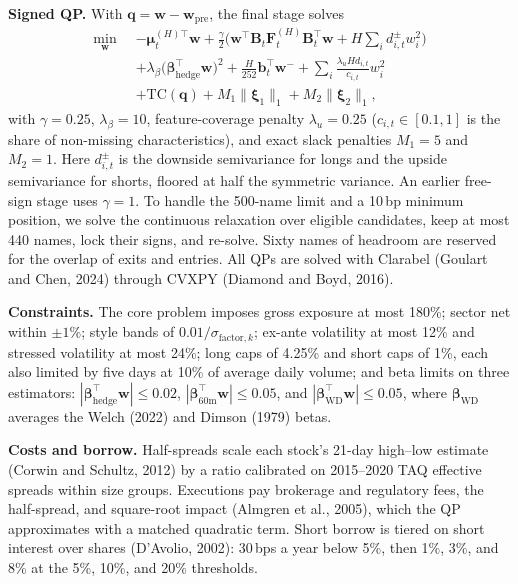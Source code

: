 \documentclass[10pt,twocolumn,letterpaper]{article}
\begin{document}
\textbf{Signed QP.} With $\mathbf{q} = \mathbf{w} - \mathbf{w}_{\text{pre}}$, the final stage solves
\begin{align}
\min_{\mathbf{w}} \;\; & -\bm{\mu}_t^{(H)\top}\mathbf{w} + \frac{\gamma}{2}\Big(\mathbf{w}^\top \mathbf{B}_t \mathbf{F}_t^{(H)}\mathbf{B}_t^\top \mathbf{w} + H\sum_i d_{i,t}^{\pm} w_i^2\Big) \nonumber\\
& + \lambda_\beta\big(\bm{\beta}_{\text{hedge}}^\top \mathbf{w}\big)^2 + \frac{H}{252}\mathbf{b}_t^\top \mathbf{w}^- + \sum_i \frac{\lambda_u H d_{i,t}}{c_{i,t}}w_i^2 \nonumber\\
& + \mathrm{TC}(\mathbf{q}) + M_1\|\bm{\xi}_1\|_1 + M_2\|\bm{\xi}_2\|_1, \label{eq:fiam_qp}
\end{align}
with $\gamma = 0.25$, $\lambda_\beta = 10$, feature-coverage penalty $\lambda_u = 0.25$ ($c_{i,t} \in [0.1, 1]$ is the share of non-missing characteristics), and exact slack penalties $M_1 = 5$ and $M_2 = 1$. Here $d_{i,t}^{\pm}$ is the downside semivariance for longs and the upside semivariance for shorts, floored at half the symmetric variance. An earlier free-sign stage uses $\gamma = 1$. To handle the 500-name limit and a 10\,bp minimum position, we solve the continuous relaxation over eligible candidates, keep at most 440 names, lock their signs, and re-solve. Sixty names of headroom are reserved for the overlap of exits and entries. All QPs are solved with Clarabel (Goulart and Chen, 2024) through CVXPY (Diamond and Boyd, 2016).

\textbf{Constraints.} The core problem imposes gross exposure at most 180\%; sector net within $\pm 1\%$; style bands of $0.01/\sigma_{\text{factor},k}$; ex-ante volatility at most 12\% and stressed volatility at most 24\%; long caps of 4.25\% and short caps of 1\%, each also limited by five days at 10\% of average daily volume; and beta limits on three estimators: $|\bm{\beta}_{\text{hedge}}^\top \mathbf{w}| \le 0.02$, $|\bm{\beta}_{60\text{m}}^\top \mathbf{w}| \le 0.05$, and $|\bm{\beta}_{\text{WD}}^\top \mathbf{w}| \le 0.05$, where $\bm{\beta}_{\text{WD}}$ averages the Welch (2022) and Dimson (1979) betas.

\textbf{Costs and borrow.} Half-spreads scale each stock's 21-day high--low estimate (Corwin and Schultz, 2012) by a ratio calibrated on 2015--2020 TAQ effective spreads within size groups. Executions pay brokerage and regulatory fees, the half-spread, and square-root impact (Almgren et al., 2005), which the QP approximates with a matched quadratic term. Short borrow is tiered on short interest over shares (D'Avolio, 2002): 30\,bps a year below 5\%, then 1\%, 3\%, and 8\% at the 5\%, 10\%, and 20\% thresholds.
\end{document}

